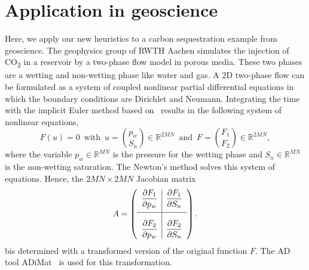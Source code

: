 \documentclass[12pt, twoside,a4paper,toc=bibliography]{scrbook}
\newcommand{\field}[1]{\mathbb{#1}}
\newcommand{\R}{\ensuremath{\field{R}}}
\begin{document}


\clearpage
\section{Application in geoscience}
\label{s.application}
Here, we apply our new heuristics to a carbon sequestration example from geoscience.
The geophysics group of RWTH Aachen simulates the injection of CO\textsubscript{2}
in a reservoir by a two-phase flow model in porous media. These two phases are a wetting
and non-wetting phase like water and gas. A 2D two-phase flow can be formulated as
a system of coupled nonlinear partial differential equations in which the boundary conditions
are Dirichlet and Neumann. Integrating the time with the implicit Euler method
based on~\cite{Busing2014UEJ,Lulfesmann2012Fap} results in the following system of nonlinear equations,
$$F(u)=0 \, \text{ with } \, u = \binom{p_w}{S_n} \in \R^{2MN} \, \text{ and } \, F = \binom{F_1}{F_2} \in \R^{2MN},$$
where the variable $p_w \in \R^{MN}$ is the pressure for the wetting phase and $S_n \in \R^{MN}$ is the non-wetting saturation. The Newton's method solves this system of equations.
Hence, the $2MN \times 2MN$ Jacobian matrix 
$$
A =
\left({\begin{array}{l|l}
	\displaystyle \frac{\partial F_1}{\partial p_w} & \displaystyle \frac{\partial F_1}{\partial S_n} \\[1em]
	\hline
	\displaystyle \frac{\partial F_2}{\partial p_w} \rule[-7.5pt]{0pt}{30pt} & \displaystyle \frac{\partial F_2}{\partial S_n} \\
 \end{array}} \right).
$$
bis determined with a transformed version of the original function $F$. The AD tool \mbox{ADiMat}~\cite{Bischof2002CST,Willkomm2014ANU} is used for this transformation.
\end{document}
